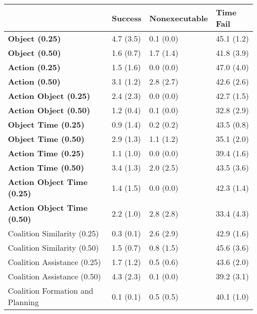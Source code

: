 \begin{tabular}{llll}
\hline
                                    & Success   & Nonexecutable   & Time Fail   \\
\hline
 \textbf{Object (0.25)}             & 4.7 (3.5) & 0.1 (0.0)       & 45.1 (1.2)  \\
 \textbf{Object (0.50)}             & 1.6 (0.7) & 1.7 (1.4)       & 41.8 (3.9)  \\
 \textbf{Action (0.25)}             & 1.5 (1.6) & 0.0 (0.0)       & 47.0 (4.0)  \\
 \textbf{Action (0.50)}             & 3.1 (1.2) & 2.8 (2.7)       & 42.6 (2.6)  \\
 \textbf{Action Object (0.25)}      & 2.4 (2.3) & 0.0 (0.0)       & 42.7 (1.5)  \\
 \textbf{Action Object (0.50)}      & 1.2 (0.4) & 0.1 (0.0)       & 32.8 (2.9)  \\
 \textbf{Object Time (0.25)}        & 0.9 (1.4) & 0.2 (0.2)       & 43.5 (0.8)  \\
 \textbf{Object Time (0.50)}        & 2.9 (1.3) & 1.1 (1.2)       & 35.1 (2.0)  \\
 \textbf{Action Time (0.25)}        & 1.1 (1.0) & 0.0 (0.0)       & 39.4 (1.6)  \\
 \textbf{Action Time (0.50)}        & 3.4 (1.3) & 2.0 (2.5)       & 43.5 (3.6)  \\
 \textbf{Action Object Time (0.25)} & 1.4 (1.5) & 0.0 (0.0)       & 42.3 (1.4)  \\
 \textbf{Action Object Time (0.50)} & 2.2 (1.0) & 2.8 (2.8)       & 33.4 (4.3)  \\
 Coalition Similarity (0.25)        & 0.3 (0.1) & 2.6 (2.9)       & 42.9 (1.6)  \\
 Coalition Similarity (0.50)        & 1.5 (0.7) & 0.8 (1.5)       & 45.6 (3.6)  \\
 Coalition Assistance (0.25)        & 1.7 (1.2) & 0.5 (0.6)       & 43.6 (2.0)  \\
 Coalition Assistance (0.50)        & 4.3 (2.3) & 0.1 (0.0)       & 39.2 (3.1)  \\
 Coalition Formation and Planning   & 0.1 (0.1) & 0.5 (0.5)       & 40.1 (1.0)  \\
\hline
\end{tabular}